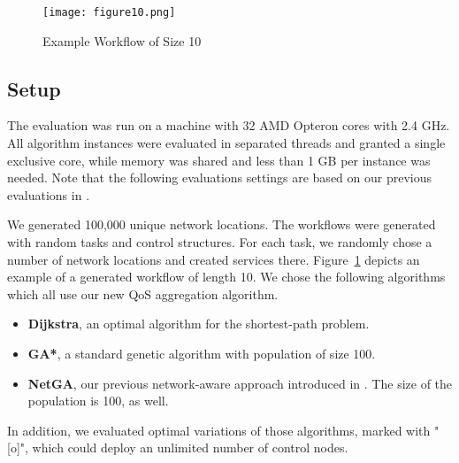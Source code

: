 \documentclass[10pt, conference, compsocconf]{IEEEtran}
\newcommand{\oneImage}{3.2in}
\begin{document}
\begin{figure}[b]
	\centering
	\texttt{[image: figure10.png]}
	\caption{Example Workflow of Size 10}
	\label{fig:generated_workflows}
\end{figure}

\subsection{Setup}
\noindent The evaluation was run on a machine with 32 AMD Opteron cores with 2.4 GHz.
All algorithm instances were evaluated in separated threads and granted a single exclusive core,
	while memory was shared and less than 1 GB per instance was needed.
Note that the following evaluations settings are based on our previous evaluations in \cite{Klein2012}.
	
We generated 100,000 unique network locations.
The workflows were generated with random tasks and control structures.
For each task, we randomly chose a number of network locations and created services there.
Figure~\ref{fig:generated_workflows} depicts an example of a generated workflow of length 10.
We chose the following algorithms which all use our new QoS aggregation algorithm.
\begin{itemize}
	\item \textbf{Dijkstra}, an optimal algorithm for the shortest-path problem.
	\item \textbf{GA*}, a standard genetic algorithm with population of size 100.
	\item \textbf{NetGA}, our previous network-aware approach introduced in \cite{Klein2012}. The size of the population is 100, as well. 
\end{itemize}
In addition, we evaluated optimal variations of those algorithms, marked with "[o]",
	which could deploy an unlimited number of control nodes.
\end{document}
